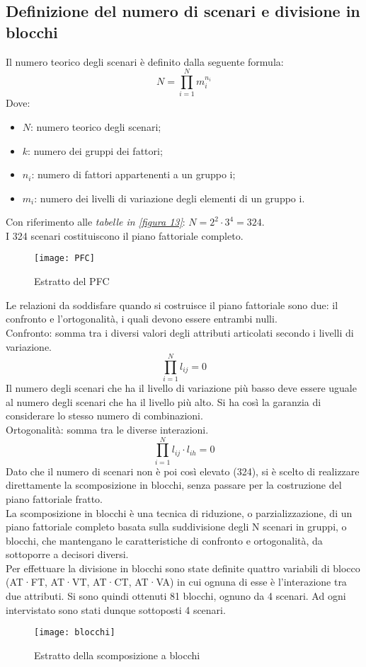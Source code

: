 \documentclass{article}
\begin{document}
\subsection{Definizione del numero di scenari e divisione in blocchi}
Il numero teorico degli scenari è definito dalla seguente formula:
\begin{equation}
N=\prod^{N}_{i=1}m^{n_{i}}_{i}
\end{equation}
Dove:
\begin{itemize}
\item $N$: numero teorico degli scenari;
\item $k$: numero dei gruppi dei fattori;
\item $n_i$: numero di fattori appartenenti a un gruppo i;
\item $m_i$: numero dei livelli di variazione degli elementi di un gruppo i.
\end{itemize}
Con riferimento alle\textit{ tabelle in \ref{figura 13}}:  $N = 2^{2}\cdot 3^{4}=324$.\\
I 324 scenari costituiscono il piano fattoriale completo.\\
\begin{figure}[H]
\centering
\texttt{[image: PFC]}
\caption{Estratto del PFC}
\end{figure}
Le relazioni da soddisfare quando si costruisce il piano fattoriale sono due: il confronto e l’ortogonalità, i quali devono essere entrambi nulli.\\
Confronto: somma tra i diversi valori degli attributi articolati secondo i livelli di variazione. 
\begin{equation}
\prod^{N}_{i=1}l_{ij}=0
\end{equation}
Il numero degli scenari che ha il livello di variazione più basso deve essere uguale al numero degli scenari che ha il livello più alto. Si ha così la garanzia di considerare lo stesso numero di combinazioni.\\
Ortogonalità: somma tra le diverse interazioni.\\
\begin{equation}
\prod^{N}_{i=1}l_{ij}\cdot l_{ih}=0
\end{equation}
Dato che il numero di scenari non è poi così elevato (324), si è scelto di realizzare direttamente la scomposizione in blocchi, senza passare per la costruzione del piano fattoriale fratto.\\
La scomposizione in blocchi è una tecnica di riduzione, o parzializzazione, di un piano fattoriale completo basata sulla suddivisione degli N scenari in gruppi, o blocchi, che mantengano le caratteristiche di confronto e ortogonalità, da sottoporre a decisori diversi.\\
Per effettuare la divisione in blocchi sono state definite quattro variabili di blocco (AT·FT, AT·VT, AT·CT, AT·VA) in cui ognuna di esse è l’interazione tra due attributi. Si sono quindi ottenuti 81 blocchi, ognuno da 4 scenari. Ad ogni intervistato sono stati dunque sottoposti 4 scenari.
\begin{figure}[H]
\centering
\texttt{[image: blocchi]}
\caption{Estratto della scomposizione a blocchi}
\end{figure}
\end{document}
